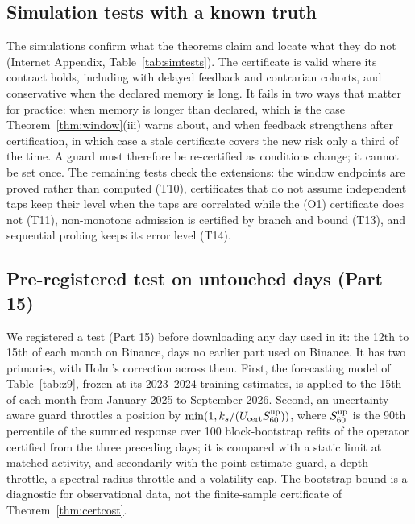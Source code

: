 \documentclass[12pt]{article}
\theoremstyle{definition}
\theoremstyle{remark}
\begin{document}
\subsection{Simulation tests with a known truth}\label{sec:simtests}



The simulations confirm what the theorems claim and locate what they do not (Internet Appendix, Table~\ref{tab:simtests}). The certificate is valid where its contract holds, including with delayed feedback and contrarian cohorts, and conservative when the declared memory is long. It fails in two ways that matter for practice: when memory is longer than declared, which is the case Theorem~\ref{thm:window}(iii) warns about, and when feedback strengthens after certification, in which case a stale certificate covers the new risk only a third of the time. A guard must therefore be re-certified as conditions change; it cannot be set once. The remaining tests check the extensions: the window endpoints are proved rather than computed (T10), certificates that do not assume independent taps keep their level when the taps are correlated while the (O1) certificate does not (T11), non-monotone admission is certified by branch and bound (T13), and sequential probing keeps its error level (T14).

\subsection{Pre-registered test on untouched days (Part 15)}\label{sec:p15}
We registered a test (Part 15) before downloading any day used in it: the 12th to 15th of each month on Binance, days no earlier part used on Binance. It has two primaries, with Holm's correction across them. First, the forecasting model of Table~\ref{tab:z9}, frozen at its 2023--2024 training estimates, is applied to the 15th of each month from January 2025 to September 2026. Second, an uncertainty-aware guard throttles a position by $\min(1,k_s/(U_{\rm cert}S^{\rm up}_{60}))$, where $S^{\rm up}_{60}$ is the 90th percentile of the summed response over 100 block-bootstrap refits of the operator certified from the three preceding days; it is compared with a static limit at matched activity, and secondarily with the point-estimate guard, a depth throttle, a spectral-radius throttle and a volatility cap. The bootstrap bound is a diagnostic for observational data, not the finite-sample certificate of Theorem~\ref{thm:certcost}.
\end{document}
